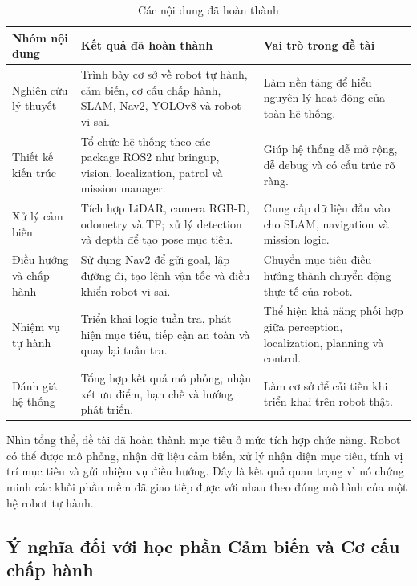 \begin{table}[H]
    \centering
    \caption{Các nội dung đã hoàn thành}
    \label{tab:completed-work}
    \renewcommand{\arraystretch}{1.25}
    \small
    \begin{tabularx}{\textwidth}{|>{\raggedright\arraybackslash}p{}|>{\raggedright\arraybackslash}p{}|>{\raggedright\arraybackslash}X|}
        \hline
        \textbf{Nhóm nội dung} & \textbf{Kết quả đã hoàn thành} & \textbf{Vai trò trong đề tài} \\
        \hline
        Nghiên cứu lý thuyết & Trình bày cơ sở về robot tự hành, cảm biến, cơ cấu chấp hành, SLAM, Nav2, YOLOv8 và robot vi sai. & Làm nền tảng để hiểu nguyên lý hoạt động của toàn hệ thống. \\
        \hline
        Thiết kế kiến trúc & Tổ chức hệ thống theo các package ROS2 như bringup, vision, localization, patrol và mission manager. & Giúp hệ thống dễ mở rộng, dễ debug và có cấu trúc rõ ràng. \\
        \hline
        Xử lý cảm biến & Tích hợp LiDAR, camera RGB-D, odometry và TF; xử lý detection và depth để tạo pose mục tiêu. & Cung cấp dữ liệu đầu vào cho SLAM, navigation và mission logic. \\
        \hline
        Điều hướng và chấp hành & Sử dụng Nav2 để gửi goal, lập đường đi, tạo lệnh vận tốc và điều khiển robot vi sai. & Chuyển mục tiêu điều hướng thành chuyển động thực tế của robot. \\
        \hline
        Nhiệm vụ tự hành & Triển khai logic tuần tra, phát hiện mục tiêu, tiếp cận an toàn và quay lại tuần tra. & Thể hiện khả năng phối hợp giữa perception, localization, planning và control. \\
        \hline
        Đánh giá hệ thống & Tổng hợp kết quả mô phỏng, nhận xét ưu điểm, hạn chế và hướng phát triển. & Làm cơ sở để cải tiến khi triển khai trên robot thật. \\
        \hline
    \end{tabularx}
\end{table}

Nhìn tổng thể, đề tài đã hoàn thành mục tiêu ở mức tích hợp chức năng. Robot có thể được mô phỏng, nhận dữ liệu cảm biến, xử lý nhận diện mục tiêu, tính vị trí mục tiêu và gửi nhiệm vụ điều hướng. Đây là kết quả quan trọng vì nó chứng minh các khối phần mềm đã giao tiếp được với nhau theo đúng mô hình của một hệ robot tự hành.

\subsection{Ý nghĩa đối với học phần Cảm biến và Cơ cấu chấp hành}
\label{subsec:course-relevance}

